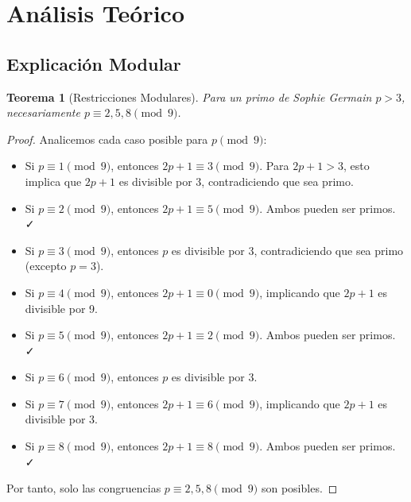 \documentclass[11pt,a4paper]{article}
\newtheorem{theorem}{Teorema}
\theoremstyle{definition}
\theoremstyle{remark}
\begin{document}
\section{Análisis Teórico}

\subsection{Explicación Modular}

\begin{theorem}[Restricciones Modulares]
Para un primo de Sophie Germain $p > 3$, necesariamente $p \equiv 2, 5, 8 \pmod{9}$.
\end{theorem}

\begin{proof}
Analicemos cada caso posible para $p \pmod{9}$:

\begin{itemize}
    \item Si $p \equiv 1 \pmod{9}$, entonces $2p+1 \equiv 3 \pmod{9}$. Para $2p+1 > 3$, esto implica que $2p+1$ es divisible por 3, contradiciendo que sea primo.
    
    \item Si $p \equiv 2 \pmod{9}$, entonces $2p+1 \equiv 5 \pmod{9}$. Ambos pueden ser primos. ✓
    
    \item Si $p \equiv 3 \pmod{9}$, entonces $p$ es divisible por 3, contradiciendo que sea primo (excepto $p=3$).
    
    \item Si $p \equiv 4 \pmod{9}$, entonces $2p+1 \equiv 0 \pmod{9}$, implicando que $2p+1$ es divisible por 9.
    
    \item Si $p \equiv 5 \pmod{9}$, entonces $2p+1 \equiv 2 \pmod{9}$. Ambos pueden ser primos. ✓
    
    \item Si $p \equiv 6 \pmod{9}$, entonces $p$ es divisible por 3.
    
    \item Si $p \equiv 7 \pmod{9}$, entonces $2p+1 \equiv 6 \pmod{9}$, implicando que $2p+1$ es divisible por 3.
    
    \item Si $p \equiv 8 \pmod{9}$, entonces $2p+1 \equiv 8 \pmod{9}$. Ambos pueden ser primos. ✓
\end{itemize}

Por tanto, solo las congruencias $p \equiv 2, 5, 8 \pmod{9}$ son posibles.
\end{proof}
\end{document}
